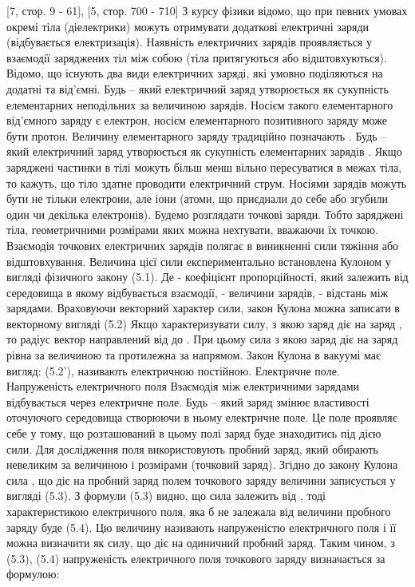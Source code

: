 [7, стор. 9 - 61], [5, стор. 700 - 710]
З курсу фізики відомо, що при певних умовах окремі тіла (діелектрики) можуть отримувати додаткові електричні заряди (відбувається електризація). Наявність електричних зарядів проявляється у взаємодії заряджених тіл між собою (тіла притягуються або відштовхуються).
Відомо, що існують два види електричних заряді, які умовно поділяються на додатні та від'ємні. Будь – який електричний заряд утворюється як сукупність елементарних неподільних за величиною зарядів. Носієм такого елементарного від'ємного заряду є електрон, носієм елементарного позитивного заряду може бути протон. Величину елементарного заряду традиційно позначають  .
Будь – який електричний заряд утворюється як сукупність елементарних зарядів 	 .
Якщо заряджені частинки в тілі можуть більш менш вільно пересуватися в межах тіла, то кажуть, що тіло здатне проводити електричний струм. Носіями зарядів можуть бути не тільки електрони, але іони (атоми, що приєднали до себе або згубили один чи декілька електронів).
Будемо розглядати точкові заряди. Тобто заряджені тіла, геометричними розмірами яких можна нехтувати, вважаючи їх точкою. Взаємодія точкових електричних зарядів полягає в виникненні сили тяжіння або відштовхування. Величина цієї сили експериментально встановлена Кулоном у вигляді фізичного закону   									(5.1).
Де   - коефіцієнт пропорційності, який залежить від середовища в якому відбувається взаємодії,   - величини зарядів,  - відстань між зарядами.
Враховуючи векторний характер сили, закон Кулона можна записати в векторному вигляді 	 							(5.2)
Якщо характеризувати силу, з якою заряд   діє на заряд  , то радіус вектор   направлений  від   до  . При цьому сила з якою заряд   діє на заряд   рівна за величиною та протилежна за напрямом. Закон Кулона в вакуумі має вигляд:  									(5.2'),
  називають електричною постійною.
Електричне поле. Напруженість електричного поля
Взаємодія між електричними зарядами відбувається через електричне поле. Будь – який заряд змінює властивості оточуючого середовища створюючи в ньому електричне поле. Це поле проявляє себе у тому, що розташований в цьому полі заряд буде знаходитись під дією сили.
Для дослідження поля використовують пробний заряд, який обирають невеликим за величиною і розмірами (точковий заряд). Згідно до закону Кулона сила  , що діє на пробний заряд   полем точкового заряду величини   записується у вигляді  	  					(5.3).
З формули (5.3) видно, що сила   залежить від  , тоді характеристикою електричного поля, яка б не залежала від величини пробного заряду буде 
 										(5.4).
Цю величину називають напруженістю електричного поля і її можна визначити як силу, що діє на одиничний пробний заряд. Таким чином, з (5.3), (5.4) напруженість електричного поля точкового заряду   визначається за формулою:
